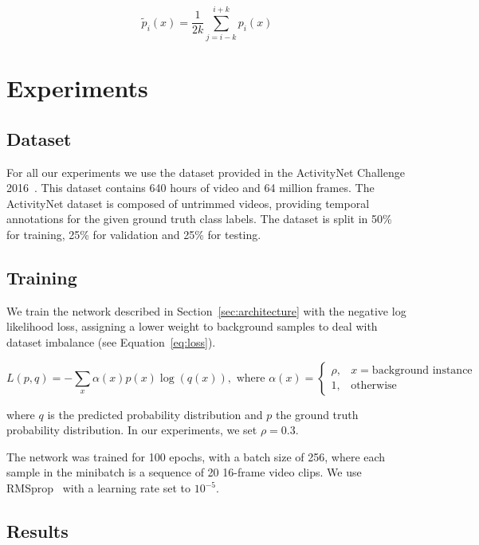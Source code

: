 \documentclass{article}
\begin{document}
\begin{equation}
	\tilde{p}_i(x) = \frac{1}{2k} \sum_{j=i-k}^{i+k} p_i(x)
    \label{eq:smooth}
\end{equation}



\section{Experiments}

\subsection{Dataset}
For all our experiments we use the dataset provided in the ActivityNet Challenge 2016~\cite{caba2015activitynet}. This dataset contains 640 hours of video and 64 million frames. The ActivityNet dataset is composed of untrimmed videos, providing temporal annotations for the given ground truth class labels. The dataset is split in 50\% for training, 25\% for validation and 25\% for testing.

\subsection{Training}
We train the network described in Section~\ref{sec:architecture} with the negative log likelihood loss, assigning a lower weight to background samples to deal with dataset imbalance (see Equation~\ref{eq:loss}).

\begin{equation}
    L(p,q) = - \sum_x \alpha(x) p(x) \log (q(x)), \text{ where } \alpha(x) =
    \begin{cases}
        \rho, & x = \text{background instance}\\
        1,    & \text{otherwise}
    \end{cases}
    \label{eq:loss}
\end{equation}

where $q$ is the predicted probability distribution and $p$ the ground truth probability distribution. In our experiments, we set $\rho = 0.3$.

The network was trained for 100 epochs, with a batch size of 256, where each sample in the minibatch is a sequence of 20 16-frame video clips. We use RMSprop~\cite{dauphin2015rmsprop} with a learning rate set to $10^{-5}$.



\subsection{Results}
\label{sec:resultats}
\end{document}
